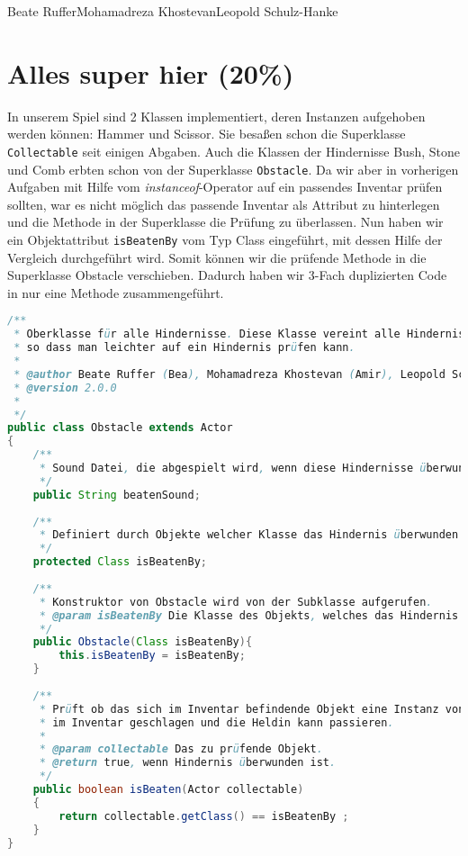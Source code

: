 \documentclass{pi1}
\begin{document}
		{Beate Ruffer}{Mohamadreza Khostevan}{Leopold Schulz-Hanke}

\section{Alles super hier (20\%)}
In unserem Spiel sind 2 Klassen implementiert, deren Instanzen aufgehoben werden können: Hammer und Scissor. Sie besaßen schon die Superklasse \texttt{Collectable} seit einigen Abgaben. Auch die Klassen der Hindernisse Bush, Stone und Comb erbten schon von der Superklasse \texttt{Obstacle}. Da wir aber in vorherigen Aufgaben mit Hilfe vom \emph{instanceof}-Operator auf ein passendes Inventar prüfen sollten, war es nicht möglich das passende Inventar als Attribut zu hinterlegen und die Methode in der Superklasse die Prüfung zu überlassen. Nun haben wir ein Objektattribut \texttt{isBeatenBy} vom Typ Class eingeführt, mit dessen Hilfe der Vergleich durchgeführt wird. Somit können wir die prüfende Methode in die Superklasse Obstacle verschieben. Dadurch haben wir 3-Fach duplizierten Code in nur eine Methode zusammengeführt.

\begin{lstlisting}[caption={Klasse \emph{Obstacle}}, firstnumber=3, language=Java]
/**
 * Oberklasse für alle Hindernisse. Diese Klasse vereint alle Hindernisse,
 * so dass man leichter auf ein Hindernis prüfen kann.
 * 
 * @author Beate Ruffer (Bea), Mohamadreza Khostevan (Amir), Leopold Schulz-Hanke (Leo) 
 * @version 2.0.0
 * 
 */
public class Obstacle extends Actor
{   
    /**
     * Sound Datei, die abgespielt wird, wenn diese Hindernisse überwunden wurden.
     */
    public String beatenSound;
    
    /**
     * Definiert durch Objekte welcher Klasse das Hindernis überwunden werden kann
     */
    protected Class isBeatenBy;
    
    /**
     * Konstruktor von Obstacle wird von der Subklasse aufgerufen.
     * @param isBeatenBy Die Klasse des Objekts, welches das Hindernis überwinden kann.
     */
    public Obstacle(Class isBeatenBy){
        this.isBeatenBy = isBeatenBy;
    }
    
    /**
     * Prüft ob das sich im Inventar befindende Objekt eine Instanz von isBeatenBy ist. Falls ja, wird das Hindernis von dem Objekt
     * im Inventar geschlagen und die Heldin kann passieren.
     * 
     * @param collectable Das zu prüfende Objekt.
     * @return true, wenn Hindernis überwunden ist.
     */
    public boolean isBeaten(Actor collectable)
    {
        return collectable.getClass() == isBeatenBy ;
    }
}

\end{lstlisting}
\end{document}
